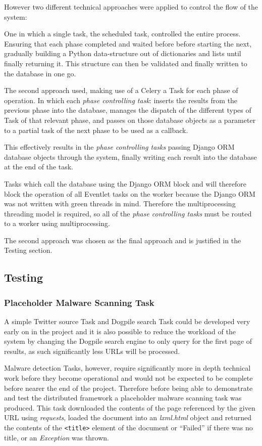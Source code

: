 However two different technical approaches were applied to control the flow of the system:

One in which a single task, the scheduled task, controlled the entire process.  Ensuring that each phase completed and waited before before starting the next, gradually building a Python data-structure out of dictionaries and lists until finally returning it.  This structure can then be validated and finally written to the database in one go.

The second approach used, making use of a Celery a Task for each phase of operation.  In which each \emph{phase controlling task}: inserts the results from the previous phase into the database, manages the dispatch of the different types of Task of that relevant phase, and passes on those database objects as a parameter to a partial task of the next phase to be used as a callback. 

This effectively results in the \emph{phase controlling tasks} passing Django ORM database objects through the system, finally writing each result into the database at the end of the task.

Tasks which call the database using the Django ORM block and will therefore block the operation of all Eventlet tasks on the worker because the Django ORM was not written with green threads in mind.  Therefore the multiprocessing threading model is required, so all of the \emph{phase controlling tasks} must be routed to a worker using multiprocessing.

The second approach was chosen as the final approach and is justified in the Testing section.

\subsection{Testing}
\subsubsection{Placeholder Malware Scanning Task}
A simple Twitter source Task and Dogpile search Task could be developed very early on in the project and it is also possible to reduce the workload of the system by changing the Dogpile search engine to only query for the first page of results, as such significantly less URLs will be processed.

Malware detection Tasks, however, require significantly more in depth technical work before they become operational and would not be expected to be complete before nearer the end of the project. Therefore before being able to demonstrate and test the distributed framework a placeholder malware scanning task was produced. This task downloaded the contents of the page referenced by the given URL using \emph{requests}, loaded the document into an \emph{lxml.html} object and returned the contents of the \verb`<title>` element of the document or ``Failed'' if there was no title, or an \emph{Exception} was thrown.

